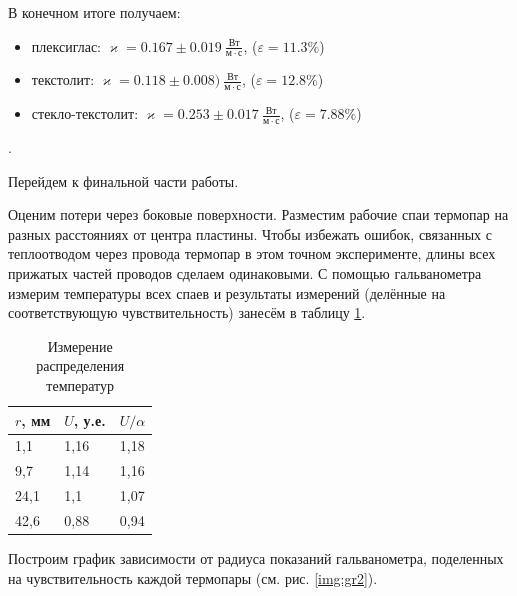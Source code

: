 \documentclass[a4paper, 12pt]{article}
\newcounter{Points}
\newcommand{\point}{\arabic{Points}. \addtocounter{Points}{1}}
\begin{document}
В конечном итоге получаем:

\begin{itemize}
    \item плексиглас: $ \varkappa = 0.167 \pm 0.019~\frac{Вт}{м \cdot с} $, ($\varepsilon = 11.3\%$)
    
    \item текстолит: $ \varkappa = 0.118 \pm 0.008)~\frac{Вт}{м \cdot с} $, ($\varepsilon = 12.8\%$)
    
    \item стекло-текстолит: $ \varkappa = 0.253 \pm 0.017~\frac{Вт}{м \cdot с} $, ($\varepsilon = 7.88\%$)
\end{itemize}

\point Перейдем к финальной части работы.

Оценим потери через боковые поверхности. Разместим рабочие спаи термопар на разных расстояниях от центра пластины. Чтобы избежать ошибок, связанных с теплоотводом через провода термопар в этом точном эксперименте, длины всех прижатых частей проводов сделаем одинаковыми. С помощью гальванометра измерим температуры всех спаев и результаты измерений (делённые на соответствующую чувствительность) занесём в таблицу \ref{tab:losses}.

\begin{table}[H]
	\centering
	\begin{tabular}{|l|l|l|}
		\hline
		$ r $, мм & $ U $, у.е. & $ U/\alpha $  \\ \hline
		1,1   & 1,16    & 1,18 \\ \hline
		9,7   & 1,14    & 1,16 \\ \hline
		24,1  & 1,1     & 1,07 \\ \hline
		42,6  & 0,88    & 0,94 \\ \hline
	\end{tabular}
	\caption{Измерение распределения температур}
	\label{tab:losses}
\end{table}

Построим график зависимости от радиуса показаний гальванометра, поделенных на чувствительность каждой термопары (см. рис. \ref{img:gr2}). 
\end{document}
